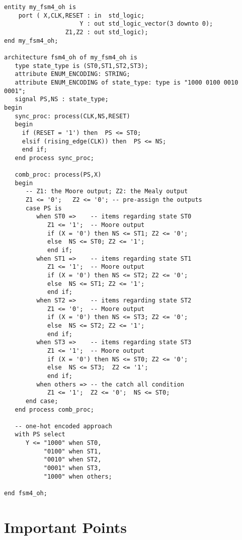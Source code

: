 \newpage\clearpage
\begin{lstlisting}[label=exe_21_code_4, caption=The final solution to Example 21.]
entity my_fsm4_oh is 
    port ( X,CLK,RESET : in  std_logic; 
                     Y : out std_logic_vector(3 downto 0); 
                 Z1,Z2 : out std_logic);  
end my_fsm4_oh;

architecture fsm4_oh of my_fsm4_oh is
   type state_type is (ST0,ST1,ST2,ST3);
   attribute ENUM_ENCODING: STRING; 
   attribute ENUM_ENCODING of state_type: type is "1000 0100 0010 0001";
   signal PS,NS : state_type; 
begin
   sync_proc: process(CLK,NS,RESET)
   begin
     if (RESET = '1') then  PS <= ST0; 
     elsif (rising_edge(CLK)) then  PS <= NS; 
     end if; 
   end process sync_proc; 

   comb_proc: process(PS,X)
   begin
      -- Z1: the Moore output; Z2: the Mealy output
      Z1 <= '0';   Z2 <= '0'; -- pre-assign the outputs
      case PS is 
         when ST0 =>    -- items regarding state ST0
            Z1 <= '1';  -- Moore output 
            if (X = '0') then NS <= ST1; Z2 <= '0';   
            else  NS <= ST0; Z2 <= '1';
            end if; 
         when ST1 =>    -- items regarding state ST1
            Z1 <= '1';  -- Moore output 
            if (X = '0') then NS <= ST2; Z2 <= '0';  
            else  NS <= ST1; Z2 <= '1'; 
            end if; 
         when ST2 =>    -- items regarding state ST2
            Z1 <= '0';  -- Moore output 
            if (X = '0') then NS <= ST3; Z2 <= '0'; 
            else  NS <= ST2; Z2 <= '1'; 
            end if; 
         when ST3 =>    -- items regarding state ST3
            Z1 <= '1';  -- Moore output 
            if (X = '0') then NS <= ST0; Z2 <= '0'; 
            else  NS <= ST3;  Z2 <= '1';     
            end if; 
         when others => -- the catch all condition
            Z1 <= '1';  Z2 <= '0';  NS <= ST0; 
      end case; 
   end process comb_proc; 
 
   -- one-hot encoded approach 
   with PS select
      Y <= "1000" when ST0, 
           "0100" when ST1, 
           "0010" when ST2, 
           "0001" when ST3, 
           "1000" when others; 

end fsm4_oh;
\end{lstlisting}

\section{Important Points}


